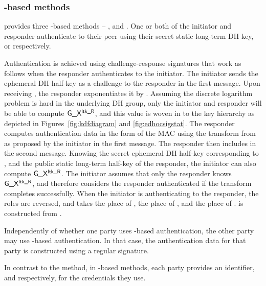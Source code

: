 \subsubsection{\mStat-based methods}
\mEdhoc{} provides three \mStat-based methods -- \mSigStat{}, \mStatStat{} and \mStatSig{}. One or both of the initiator and responder authenticate to their peer using their secret static long-term DH key, \mLtki{} or \mLtkr{} respectively.
%

Authentication is achieved using challenge-response signatures that work as follows when the responder authenticates to the initiator.
%
The initiator sends the ephemeral DH half-key \mGx{} as a challenge to the responder in the first message.
%
%
Upon receiving \mGx{}, the responder exponentiates it by \mLtkr{}.
%
Assuming the discrete logarithm problem is hard in the underlying DH group, only the initiator and responder will be able to compute $\text{\textup{\textsf{G\_X}}}{}^{\text{\textup{\textsf{ltk\_R}}}}{}$, and this value is woven in to the key hierarchy as depicted in Figures~\ref{fig:kdfdiagram} and \ref{fig:edhocsigstat}.
%
The responder computes authentication data \mAuthr{} in the form of the MAC \mMactwo{} using the \mAead{} transform from \mSuites{} as proposed by the initiator in the first message.
%
The responder then includes \mMactwo{} in the second message.
%
Knowing the secret ephemeral DH half-key corresponding to \mGx{}, and the public static long-term half-key of the responder, the initiator can also compute $\text{\textup{\textsf{G\_X}}}{}^{\text{\textup{\textsf{ltk\_R}}}}{}$.
%
The initiator assumes that only the responder knows $\text{\textup{\textsf{G\_X}}}{}^{\text{\textup{\textsf{ltk\_R}}}}{}$, and therefore considers the responder authenticated if the \mAead{} transform completes successfully.
%
When the initiator is authenticating to the responder, the roles are reversed, and \mGy{} takes the place of \mGx{}, \mLtki{} the place of \mLtkr{}, and \mAuthi{} the place of \mAuthr{}. \mAuthi{} is constructed from \mMacthree{}.
%

Independently of whether one party uses \mStat{}-based authentication, the other party may use \mSig{}-based authentication. In that case, the authentication data for that party is constructed using a regular signature.
%

In contrast to the \mPskPsk{} method, in \mStat{}-based methods, each party provides an identifier, \mIdcredi{} and \mIdcredr{} respectively, for the credentials they use.
%
%

